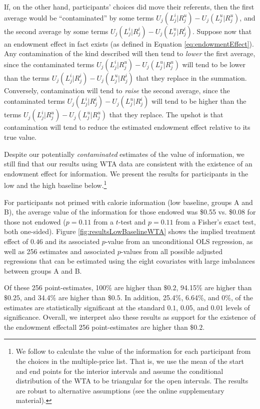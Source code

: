 If, on the other hand, participants' choices did move their referents, then the first average would be \enquote{contaminated} by some terms $U_j(L_j^i|R_j^u)-U_j(L_j^u|R_j^u)$, and the second average by some terms $U_j(L_j^i|R_j^i)-U_j(L_j^u|R_j^i)$. Suppose now that an endowment effect in fact exists (as defined in Equation \ref{eq:endowmentEffect}). Any contamination of the kind described will then tend to \emph{lower} the first average, since the contaminated terms $U_j(L_j^i|R_j^u)-U_j(L_j^u|R_j^u)$ will tend to be lower than the terms $U_j(L_j^i|R_j^i)-U_j(L_j^u|R_j^i)$ that they replace in the summation. Conversely, contamination will tend to \emph{raise} the second average, since the contaminated terms $U_j(L_j^i|R_j^i)-U_j(L_j^u|R_j^i)$ will tend to be higher than the terms $U_j(L_j^i|R_j^u)-U_j(L_j^u|R_j^u)$ that they replace. The upshot is that contamination will tend to reduce the estimated endowment effect relative to its true value.

Despite our potentially \emph{contaminated} estimates of the value of information, we still find that our results using WTA data are consistent with the existence of an endowment effect for information. We present the results for participants in the low and the high baseline below.\footnote{We follow \citet{allcottWelfareEffectsNudges2019} to calculate the value of the information for each participant from the choices in the multiple-price list. That is, we use the mean of the start and end points for the interior intervals and assume the conditional distribution of the WTA to be triangular for the open intervals. The results are robust to alternative assumptions (see the online supplementary material).}

For participants not primed with calorie information (low baseline, groups A and B), the average value of the information for those endowed was \$0.55 vs. \$0.08 for those not endowed ($p=0.11$ from a $t$-test and $p=0.11$ from a Fisher's exact test, both one-sided). Figure \ref{fig:resultsLowBaselineWTA} shows the implied treatment effect of $0.46$ and its associated $p$-value from an unconditional OLS regression, as well as 256 estimates and associated $p$-values from all possible adjusted regressions that can be estimated using the eight covariates with large imbalances between groups A and B.

Of these 256 point-estimates, 100\% are higher than $\$0.2$, 94.15\% are higher than $\$0.25$, and 34.4\% are higher than $\$0.5$. In addition, 25.4\%, 6.64\%, and 0\%, of the estimates are statistically significant at the standard $0.1$, $0.05$, and $0.01$ levels of significance. Overall, we interpret also these results as support for the existence of the endowment effect\textemdash all 256 point-estimates are higher than $\$0.2$.

